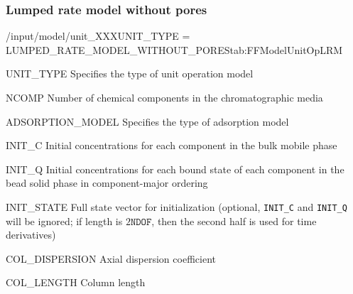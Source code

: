 \subsubsection{Lumped rate model without pores}

\begin{condsubgroup}{/input/model/unit\_XXX}{UNIT\_TYPE = LUMPED\_RATE\_MODEL\_WITHOUT\_PORES}{tab:FFModelUnitOpLRM}
  \begin{dataset}[type=string,range={\texttt{LUMPED\_RATE\_MODEL\_WITHOUT\_PORES}},length=1]{UNIT\_TYPE}
    Specifies the type of unit operation model
  \end{dataset}
  \begin{dataset}[type=int,range={$\geq 1$},length=1]{NCOMP}
    Number of chemical components in the chromatographic media
  \end{dataset}
  \begin{dataset}[type=string,range={See Section~\ref{sec:FFAdsorption}},length=1]{ADSORPTION\_MODEL}
    Specifies the type of adsorption model
  \end{dataset}
  \begin{dataset}[unit=\si{\mol\per\cubic\metre\of{IV}},type=double,range={$\geq 0$},length={\texttt{NCOMP}}]{INIT\_C}
    Initial concentrations for each component in the bulk mobile phase
  \end{dataset}
  \begin{dataset}[unit=\si{\mol\per\cubic\metre\of{SP}},type=double,range={$\geq 0$},length={\texttt{NTOTALBND}}]{INIT\_Q}
    Initial concentrations for each bound state of each component in the bead solid phase in component-major ordering
  \end{dataset}
  \begin{dataset}[unit=various,type=double,range={$\mathds{R}$},length={\texttt{NDOF} / $2\texttt{NDOF}$}]{INIT\_STATE}
    Full state vector for initialization (optional, \texttt{INIT\_C} and \texttt{INIT\_Q} will be ignored; if length is $2\texttt{NDOF}$, then the second half is used for time derivatives)
  \end{dataset}
  \begin{dataset}[unit=\si{\square\metre\of{IV}\per\second},type=double,range={$\geq 0$},length={1 / \texttt{NSEC}}]{COL\_DISPERSION}
    Axial dispersion coefficient
  \end{dataset}
  \begin{dataset}[unit=\si{\metre},type=double,range={$> 0$},length={1}]{COL\_LENGTH}
    Column length
  \end{dataset}

\end{condsubgroup}
